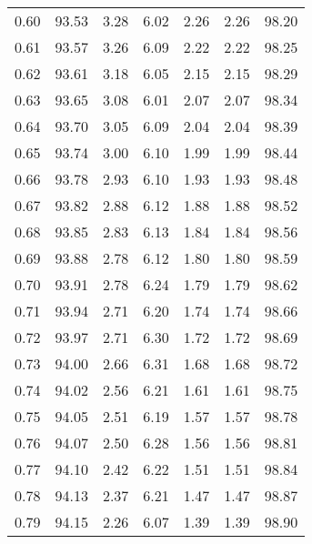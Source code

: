 \begin{tabular}{|c|c|c|c|c|c|c|}
      0.60 &     93.53 &      3.28 &       6.02 &    2.26 &       2.26 &         98.20 \\
      0.61 &     93.57 &      3.26 &       6.09 &    2.22 &       2.22 &         98.25 \\
      0.62 &     93.61 &      3.18 &       6.05 &    2.15 &       2.15 &         98.29 \\
      0.63 &     93.65 &      3.08 &       6.01 &    2.07 &       2.07 &         98.34 \\
      0.64 &     93.70 &      3.05 &       6.09 &    2.04 &       2.04 &         98.39 \\
      0.65 &     93.74 &      3.00 &       6.10 &    1.99 &       1.99 &         98.44 \\
      0.66 &     93.78 &      2.93 &       6.10 &    1.93 &       1.93 &         98.48 \\
      0.67 &     93.82 &      2.88 &       6.12 &    1.88 &       1.88 &         98.52 \\
      0.68 &     93.85 &      2.83 &       6.13 &    1.84 &       1.84 &         98.56 \\
      0.69 &     93.88 &      2.78 &       6.12 &    1.80 &       1.80 &         98.59 \\
      0.70 &     93.91 &      2.78 &       6.24 &    1.79 &       1.79 &         98.62 \\
      0.71 &     93.94 &      2.71 &       6.20 &    1.74 &       1.74 &         98.66 \\
      0.72 &     93.97 &      2.71 &       6.30 &    1.72 &       1.72 &         98.69 \\
      0.73 &     94.00 &      2.66 &       6.31 &    1.68 &       1.68 &         98.72 \\
      0.74 &     94.02 &      2.56 &       6.21 &    1.61 &       1.61 &         98.75 \\
      0.75 &     94.05 &      2.51 &       6.19 &    1.57 &       1.57 &         98.78 \\
      0.76 &     94.07 &      2.50 &       6.28 &    1.56 &       1.56 &         98.81 \\
      0.77 &     94.10 &      2.42 &       6.22 &    1.51 &       1.51 &         98.84 \\
      0.78 &     94.13 &      2.37 &       6.21 &    1.47 &       1.47 &         98.87 \\
      0.79 &     94.15 &      2.26 &       6.07 &    1.39 &       1.39 &         98.90 \\

\end{tabular}
